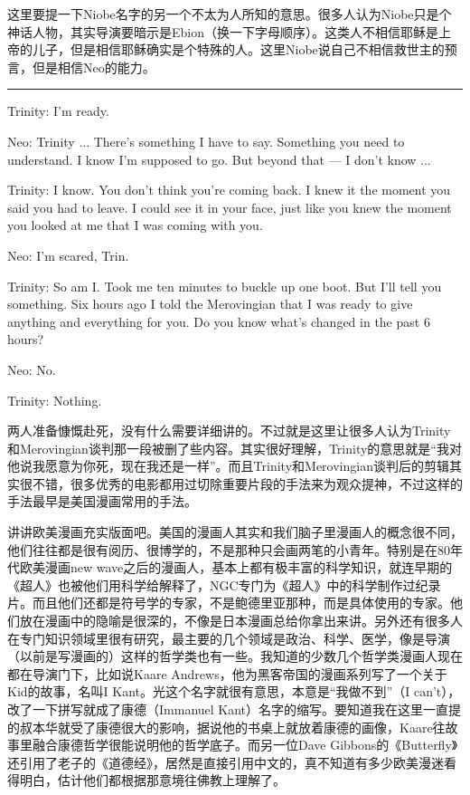 \documentclass[UTF8]{ctexart}
\newcommand{\myparsep}{\noindent \rule[0.5ex]{\linewidth}{1pt}}
\newenvironment{myquote}{\color{green} \setlength{\leftskip}{6em} \setlength{\rightskip}{4em} \setlength{\parindent}{-2em}}{\par}
\begin{document}
这里要提一下Niobe名字的另一个不太为人所知的意思。很多人认为Niobe只是个神话人物，其实导演要暗示是Ebion（换一下字母顺序）。这类人不相信耶稣是上帝的儿子，但是相信耶稣确实是个特殊的人。这里Niobe说自己不相信救世主的预言，但是相信Neo的能力。

\myparsep

\begin{myquote}
Trinity: I'm ready.

Neo: Trinity ... There's something I have to say. Something you need to understand. I know I'm supposed to go. But beyond that --- I don't know ...

Trinity: I know. You don't think you're coming back. I knew it the moment you said you had to leave. I could see it in your face, just like you knew the moment you looked at me that I was coming with you.

Neo: I'm scared, Trin.

Trinity: So am I. Took me ten minutes to buckle up one boot. But I'll tell you something. Six hours ago I told the Merovingian that I was ready to give anything and everything for you. Do you know what's changed in the past 6 hours?

Neo: No.

Trinity: Nothing.
\end{myquote}

两人准备慷慨赴死，没有什么需要详细讲的。不过就是这里让很多人认为Trinity和Merovingian谈判那一段被删了些内容。其实很好理解，Trinity的意思就是“我对他说我愿意为你死，现在我还是一样”。而且Trinity和Merovingian谈判后的剪辑其实很不错，很多优秀的电影都用过切除重要片段的手法来为观众提神，不过这样的手法最早是美国漫画常用的手法。

讲讲欧美漫画充实版面吧。美国的漫画人其实和我们脑子里漫画人的概念很不同，他们往往都是很有阅历、很博学的，不是那种只会画两笔的小青年。特别是在80年代欧美漫画new wave之后的漫画人，基本上都有极丰富的科学知识，就连早期的《超人》也被他们用科学给解释了，NGC专门为《超人》中的科学制作过纪录片。而且他们还都是符号学的专家，不是鲍德里亚那种，而是具体使用的专家。他们放在漫画中的隐喻是很深的，不像是日本漫画总给你拿出来讲。另外还有很多人在专门知识领域里很有研究，最主要的几个领域是政治、科学、医学，像是导演（以前是写漫画的）这样的哲学类也有一些。我知道的少数几个哲学类漫画人现在都在导演门下，比如说Kaare Andrews，他为黑客帝国的漫画系列写了一个关于Kid的故事，名叫I Kant。光这个名字就很有意思，本意是“我做不到”（I can't），改了一下拼写就成了康德（Immanuel Kant）名字的缩写。要知道我在这里一直提的叔本华就受了康德很大的影响，据说他的书桌上就放着康德的画像，Kaare往故事里融合康德哲学很能说明他的哲学底子。而另一位Dave Gibbons的《Butterfly》还引用了老子的《道德经》，居然是直接引用中文的，真不知道有多少欧美漫迷看得明白，估计他们都根据那意境往佛教上理解了。
\end{document}
